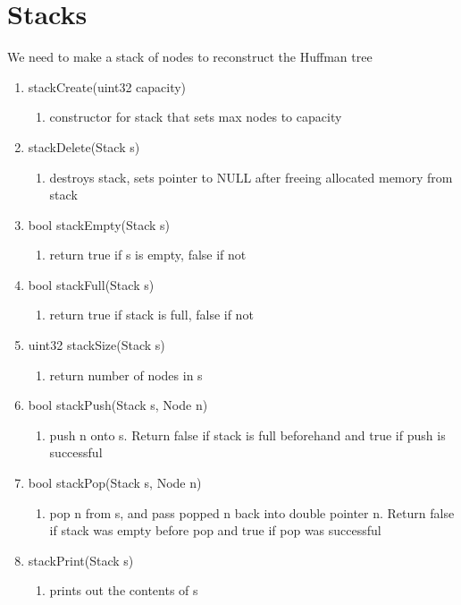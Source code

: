 \documentclass[11pt]{article}
\begin{document}
\section{Stacks}\label{ss:stacks}
We need to make a stack of nodes to reconstruct the Huffman tree
\begin{enumerate}
\item stackCreate(uint32 capacity)
	\begin{enumerate}
	\item constructor for stack that sets max nodes to capacity
	\end{enumerate}
\item stackDelete(Stack s)
	\begin{enumerate}
	\item destroys stack, sets pointer to NULL after freeing allocated memory from stack
	\end{enumerate}
\item bool stackEmpty(Stack s)
	\begin{enumerate}
	\item return true if s is empty, false if not
	\end{enumerate}
\item bool stackFull(Stack s)
	\begin{enumerate}
	\item return true if stack is full, false if not
	\end{enumerate}
\item uint32 stackSize(Stack s)
	\begin{enumerate}
	\item return number of nodes in s
	\end{enumerate}
\item bool stackPush(Stack s, Node n)
	\begin{enumerate}
	\item push n onto s. Return false if stack is full beforehand and true if push is successful
	\end{enumerate}
\item bool stackPop(Stack s, Node n)
	\begin{enumerate}
	\item pop n from s, and pass popped n back into double pointer n. Return false if stack was empty before pop and true if pop was successful
	\end{enumerate}
\item stackPrint(Stack s)
	\begin{enumerate}
	\item prints out the contents of s
	\end{enumerate}
\end{enumerate}
\end{document}
